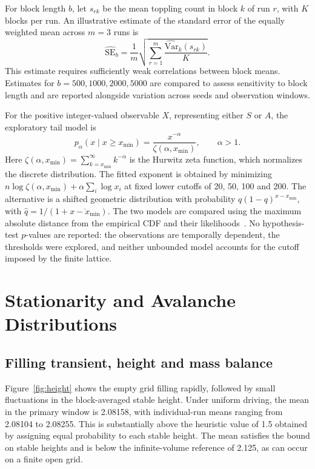 \documentclass[11pt,a4paper,oneside]{report}
\numberwithin{equation}{chapter}
\begin{document}
For block length $b$, let $s_{rk}$ be the mean toppling count in block $k$ of run $r$, with $K$ blocks per run. An illustrative estimate of the standard error of the equally weighted mean across $m=3$ runs is
\begin{equation}
 \widehat{\mathrm{SE}}_b
 =\frac1m\sqrt{\sum_{r=1}^m
  \frac{\widehat{\mathrm{Var}}_k(s_{rk})}{K}}.
 \label{eq:block}
\end{equation}
This estimate requires sufficiently weak correlations between block means. Estimates for $b=500,1000,2000,5000$ are compared to assess sensitivity to block length and are reported alongside variation across seeds and observation windows.

For the positive integer-valued observable $X$, representing either $S$ or $A$, the exploratory tail model is
\begin{equation}
 p_\alpha(x\mid x\geq x_{\min})
 =\frac{x^{-\alpha}}{\zeta(\alpha,x_{\min})},\qquad \alpha>1.
 \label{eq:tail}
\end{equation}
Here $\zeta(\alpha,x_{\min})=\sum_{k=x_{\min}}^\infty k^{-\alpha}$ is the Hurwitz zeta function, which normalizes the discrete distribution.
The fitted exponent is obtained by minimizing
$n\log\zeta(\alpha,x_{\min})+\alpha\sum_i\log x_i$ at fixed lower cutoffs of 20, 50, 100 and 200. The alternative is a shifted geometric distribution with probability
$q(1-q)^{x-x_{\min}}$, with $\hat q=1/(1+\overline{x-x_{\min}})$.
The two models are compared using the maximum absolute distance from the empirical CDF and their likelihoods~\cite{clauset2009}. No hypothesis-test $p$-values are reported: the observations are temporally dependent, the thresholds were explored, and neither unbounded model accounts for the cutoff imposed by the finite lattice.

\chapter{Stationarity and Avalanche Distributions}
\label{ch:baseline}
\section{Filling transient, height and mass balance}
\label{sec:baselineheight}
Figure~\ref{fig:height} shows the empty grid filling rapidly, followed by small fluctuations in the block-averaged stable height. Under uniform driving, the mean in the primary window is 2.08158, with individual-run means ranging from 2.08104 to 2.08255. This is substantially above the heuristic value of 1.5 obtained by assigning equal probability to each stable height. The mean satisfies the bound on stable heights and is below the infinite-volume reference of 2.125, as can occur on a finite open grid.
\end{document}
